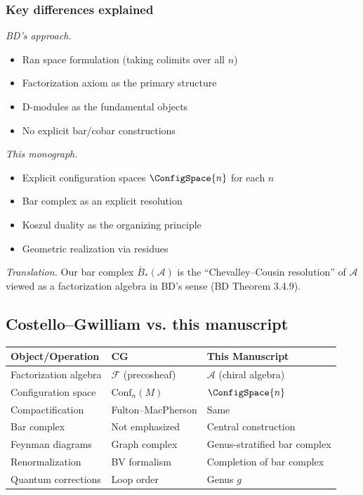 \subsubsection{Key differences explained}

\emph{BD's approach.}
\begin{itemize}
\item Ran space formulation (taking colimits over all $n$)
\item Factorization axiom as the primary structure
\item D-modules as the fundamental objects
\item No explicit bar/cobar constructions
\end{itemize}

\emph{This monograph.}
\begin{itemize}
\item Explicit configuration spaces $\ConfigSpace{n}$ for each $n$
\item Bar complex as an explicit resolution
\item Koszul duality as the organizing principle
\item Geometric realization via residues
\end{itemize}

\emph{Translation.} Our bar complex $\bar{B}_*(\mathcal{A})$ is the ``Chevalley--Cousin resolution'' of $\mathcal{A}$ viewed as a factorization algebra in BD's sense (BD Theorem 3.4.9).

\subsection{Costello--Gwilliam vs. this manuscript}

\begin{center}
\begin{tabular}{|>{\raggedright\arraybackslash}p{5.8cm}|>{\raggedright\arraybackslash}p{3.9cm}|>{\raggedright\arraybackslash}p{3.9cm}|}
\hline
\textbf{Object/Operation} & \textbf{CG \cite{CG17}} & \textbf{This Manuscript} \\
\hline
Factorization algebra & $\mathcal{F}$ (precosheaf) & $\mathcal{A}$ (chiral algebra) \\
Configuration space & $\text{Conf}_n(M)$ & $\ConfigSpace{n}$ \\
Compactification & Fulton--MacPherson & Same \\
Bar complex & Not emphasized & Central construction \\
Feynman diagrams & Graph complex & Genus-stratified bar complex \\
Renormalization & BV formalism & Completion of bar complex \\
Quantum corrections & Loop order & Genus $g$ \\
\hline
\end{tabular}
\end{center}

